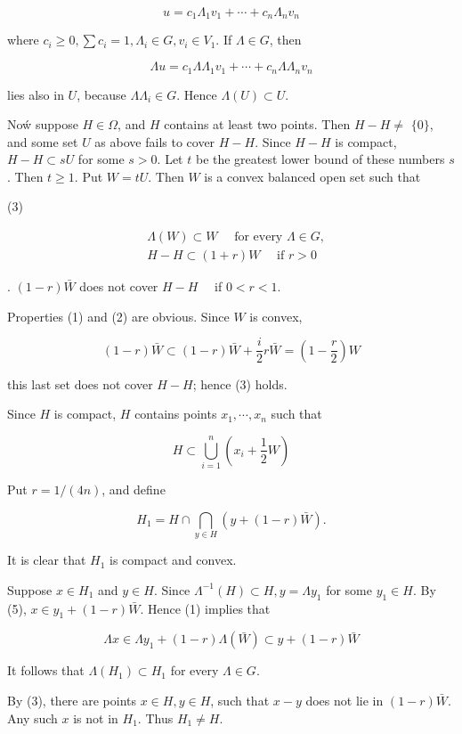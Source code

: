 \documentclass[10pt]{article}
\begin{document}
$$
u=c_{1} \Lambda_{1} v_{1}+\cdots+c_{n} \Lambda_{n} v_{n}
$$

where $c_{i} \geq 0, \sum c_{i}=1, \Lambda_{i} \in G, v_{i} \in V_{1}$. If $\Lambda \in G$, then

$$
\Lambda u=c_{1} \Lambda \Lambda_{1} v_{1}+\cdots+c_{n} \Lambda \Lambda_{n} v_{n}
$$

lies also in $U$, because $\Lambda \Lambda_{i} \in G$. Hence $\Lambda(U) \subset U$.

Noẃ suppose $H \in \Omega$, and $H$ contains at least two points. Then $H-H \neq$ $\{0\}$, and some set $U$ as above fails to cover $H-H$. Since $H-H$ is compact, $H-H \subset s U$ for some $s>0$. Let $t$ be the greatest lower bound of these numbers $s$. Then $t \geq 1$. Put $W=t U$. Then $W$ is a convex balanced open set such that

(3)

$$
\begin{aligned}
& \Lambda(W) \subset W \quad \text { for every } \Lambda \in G, \\
& H-H \subset(1+r) W \quad \text { if } r>0
\end{aligned}
$$

. $(1-r) \bar{W}$ does not cover $H-H \quad$ if $0<r<1$.

Properties (1) and (2) are obvious. Since $W$ is convex,

$$
(1-r) \bar{W} \subset(1-r) \bar{W}+\frac{i}{2} r \bar{W}=\left(1-\frac{r}{2}\right) W
$$

this last set does not cover $H-H$; hence (3) holds.

Since $H$ is compact, $H$ contains points $x_{1}, \cdots, x_{n}$ such that

$$
H \subset \bigcup_{i=1}^{n}\left(x_{i}+\frac{1}{2} W\right)
$$

Put $r=1 /(4 n)$, and define

$$
H_{1}=H \cap \bigcap_{y \in H}(y+(1-r) \bar{W}) .
$$

It is clear that $H_{1}$ is compact and convex.

Suppose $x \in H_{1}$ and $y \in H$. Since $\Lambda^{-1}(H) \subset H, y=\Lambda y_{1}$ for some $y_{1} \in H$. By (5), $x \in y_{1}+(1-r) \bar{W}$. Hence (1) implies that

$$
\Lambda x \in \Lambda y_{1}+(1-r) \Lambda(\bar{W}) \subset y+(1-r) \bar{W}
$$

It follows that $\Lambda\left(H_{1}\right) \subset H_{1}$ for every $\Lambda \in G$.

By (3), there are points $x \in H, y \in H$, such that $x-y$ does not lie in $(1-r) \bar{W}$. Any such $x$ is not in $H_{1}$. Thus $H_{1} \neq H$.
\end{document}
